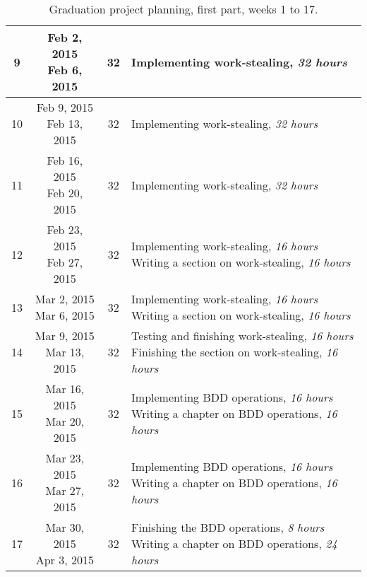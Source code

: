 \begin{table}[ht]
\begin{adjustwidth}{-.5in}{-.5in}
\begin{tabular}{| c | c | c | l |}
		9 & \specialcell{Feb 2, 2015\\Feb 6, 2015} & 32 & Implementing work-stealing, \textit{32 hours} \\ \hline
		10 & \specialcell{Feb 9, 2015\\Feb 13, 2015} & 32 & Implementing work-stealing, \textit{32 hours} \\ \hline
		11 & \specialcell{Feb 16, 2015\\Feb 20, 2015} & 32 & Implementing work-stealing, \textit{32 hours} \\ \hline 
		12 & \specialcell{Feb 23, 2015\\Feb 27, 2015} & 32 & \specialcell{Implementing work-stealing, \textit{16 hours}\\Writing a section on work-stealing, \textit{16 hours}} \\ \hline
		13 & \specialcell{Mar 2, 2015\\Mar 6, 2015} & 32 & \specialcell{Implementing work-stealing, \textit{16 hours}\\Writing a section on work-stealing, \textit{16 hours}} \\ \hline 
		14 & \specialcell{Mar 9, 2015\\Mar 13, 2015} & 32 & \specialcell{Testing and finishing work-stealing, \textit{16 hours}\\Finishing the section on work-stealing, \textit{16 hours}} \\ \hline\hline

		15 & \specialcell{Mar 16, 2015\\Mar 20, 2015} &32 & \specialcell{Implementing BDD operations, \textit{16 hours}\\Writing a chapter on BDD operations, \textit{16 hours}} \\ \hline
		16 & \specialcell{Mar 23, 2015\\Mar 27, 2015} & 32 & \specialcell{Implementing BDD operations, \textit{16 hours}\\Writing a chapter on BDD operations, \textit{16 hours}} \\ \hline
		17 & \specialcell{Mar 30, 2015\\Apr 3, 2015} & 32 & \specialcell{Finishing the BDD operations, \textit{8 hours}\\Writing a chapter on BDD operations, \textit{24 hours}} \\ \hline
	\end{tabular}
	\end{adjustwidth}
	\caption{Graduation project planning, first part, weeks 1 to 17.}
	\label{tab:planning1}
\end{table}

